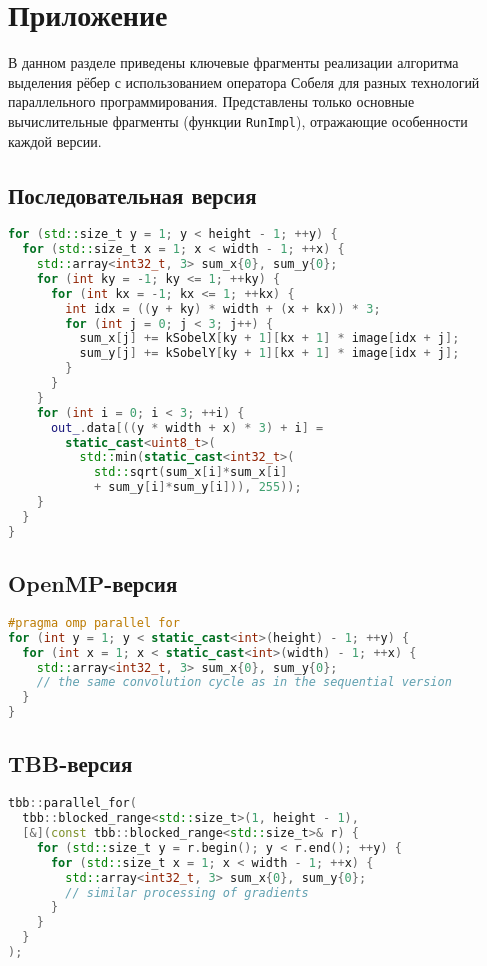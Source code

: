 \documentclass[14pt,a4paper]{extarticle}
\begin{document}
\section{Приложение}

В данном разделе приведены ключевые фрагменты реализации алгоритма выделения рёбер с использованием оператора Собеля для разных технологий параллельного программирования. 
Представлены только основные вычислительные фрагменты (функции \texttt{RunImpl}), отражающие особенности каждой версии.

\newpage

\subsection{Последовательная версия}
\begin{lstlisting}[language=C++]
for (std::size_t y = 1; y < height - 1; ++y) {
  for (std::size_t x = 1; x < width - 1; ++x) {
    std::array<int32_t, 3> sum_x{0}, sum_y{0};
    for (int ky = -1; ky <= 1; ++ky) {
      for (int kx = -1; kx <= 1; ++kx) {
        int idx = ((y + ky) * width + (x + kx)) * 3;
        for (int j = 0; j < 3; j++) {
          sum_x[j] += kSobelX[ky + 1][kx + 1] * image[idx + j];
          sum_y[j] += kSobelY[ky + 1][kx + 1] * image[idx + j];
        }
      }
    }
    for (int i = 0; i < 3; ++i) {
      out_.data[((y * width + x) * 3) + i] =
        static_cast<uint8_t>(
          std::min(static_cast<int32_t>(
            std::sqrt(sum_x[i]*sum_x[i] 
            + sum_y[i]*sum_y[i])), 255));
    }
  }
}
\end{lstlisting}

\newpage

\subsection{OpenMP-версия}
\begin{lstlisting}[language=C++]
#pragma omp parallel for
for (int y = 1; y < static_cast<int>(height) - 1; ++y) {
  for (int x = 1; x < static_cast<int>(width) - 1; ++x) {
    std::array<int32_t, 3> sum_x{0}, sum_y{0};
    // the same convolution cycle as in the sequential version
  }
}
\end{lstlisting}

\subsection{TBB-версия}
\begin{lstlisting}[language=C++]
tbb::parallel_for(
  tbb::blocked_range<std::size_t>(1, height - 1),
  [&](const tbb::blocked_range<std::size_t>& r) {
    for (std::size_t y = r.begin(); y < r.end(); ++y) {
      for (std::size_t x = 1; x < width - 1; ++x) {
        std::array<int32_t, 3> sum_x{0}, sum_y{0};
        // similar processing of gradients
      }
    }
  }
);
\end{lstlisting}
\end{document}
